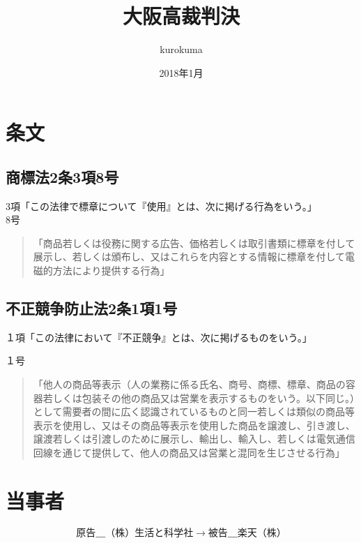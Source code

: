 \documentclass[dvipdfmx,draft,11pt]{jsarticle}
\begin{document}
\title{大阪高裁判決}
\author{kurokuma}
\date{2018年1月}
\maketitle

\section{条文}

\subsection{商標法2条3項8号}

3項「この法律で標章について『使用』とは、次に掲げる行為をいう。」\\

8号
\begin{quote}
「商品若しくは役務に関する広告、価格若しくは取引書類に標章を付して展示し、若しくは頒布し、又はこれらを内容とする情報に標章を付して電磁的方法により提供する行為」

\end{quote}

\subsection{不正競争防止法2条1項1号}


１項「この法律において『不正競争』とは、次に掲げるものをいう。」

１号
\begin{quote}
「他人の商品等表示（人の業務に係る氏名、商号、商標、標章、商品の容器若しくは包装その他の商品又は営業を表示するものをいう。以下同じ。）として需要者の間に広く認識されているものと同一若しくは類似の商品等表示を使用し、又はその商品等表示を使用した商品を譲渡し、引き渡し、譲渡若しくは引渡しのために展示し、輸出し、輸入し、若しくは電気通信回線を通じて提供して、他人の商品又は営業と混同を生じさせる行為」
\end{quote}

\section{当事者}

\[ 原告＿（株）生活と科学社　\to　被告＿楽天（株） \]








 
\end{document}
